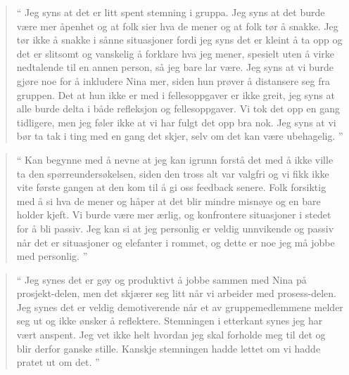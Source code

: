 \begin{quote}``
Jeg syns at det er litt spent stemning i gruppa. Jeg syns at det burde være mer åpenhet og at folk sier hva de 
mener og at folk tør å snakke. Jeg tør ikke å snakke i sånne situasjoner fordi jeg syns det er kleint å ta opp og det 
er slitsomt og vanskelig å forklare hva jeg mener, spesielt uten å virke nedtalende til en annen person, så jeg bare 
lar være. Jeg syns at vi burde gjøre noe for å inkludere Nina mer, siden hun prøver å distansere seg fra gruppen. 
Det at hun ikke er med i fellesoppgaver er ikke greit, jeg syns at alle burde delta i både refleksjon og 
fellesoppgaver. Vi tok det opp en gang tidligere, men jeg føler ikke at vi har fulgt det opp bra nok. Jeg syns at vi bør 
ta tak i ting med en gang det skjer, selv om det kan være ubehagelig.
''\end{quote} 

\begin{quote}``
Kan begynne med å nevne at jeg kan igrunn forstå det med å ikke ville ta den spørreundersøkelsen, siden den 
tross alt var valgfri og vi fikk ikke vite første gangen at den kom til å gi oss feedback senere. Folk forsiktig med å si 
hva de mener og håper at det blir mindre misnøye og en bare holder kjeft. Vi burde være mer ærlig, og konfrontere 
situasjoner i stedet for å bli passiv. Jeg kan si at jeg personlig er veldig unnvikende og passiv når det er situasjoner 
og elefanter i rommet, og dette er noe jeg må jobbe med personlig.
''\end{quote} 

\begin{quote}``
Jeg synes det er gøy og produktivt å jobbe sammen med Nina på prosjekt-delen, men det skjærer seg litt når vi 
arbeider med prosess-delen. Jeg synes det er veldig demotiverende når et av gruppemedlemmene melder seg ut 
og ikke ønsker å reflektere. Stemningen i etterkant synes jeg har vært anspent. Jeg vet ikke helt hvordan jeg skal 
forholde meg til det og blir derfor ganske stille. Kanskje stemningen hadde lettet om vi hadde pratet ut om det.
''\end{quote} 

